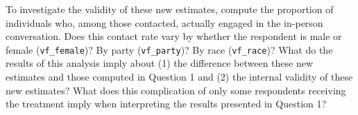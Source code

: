 \documentclass[]{article}
\begin{document}
To investigate the validity of these new estimates, compute the
proportion of individuals who, among those contacted, actually engaged
in the in-person conversation. Does this contact rate vary by whether
the respondent is male or female (\texttt{vf\_female})? By party
(\texttt{vf\_party})? By race (\texttt{vf\_race})? What do the results
of this analysis imply about (1) the difference between these new
estimates and those computed in Question 1 and (2) the internal validity
of these new estimates? What does this complication of only some
respondents receiving the treatment imply when interpreting the results
presented in Question 1?
\end{document}
